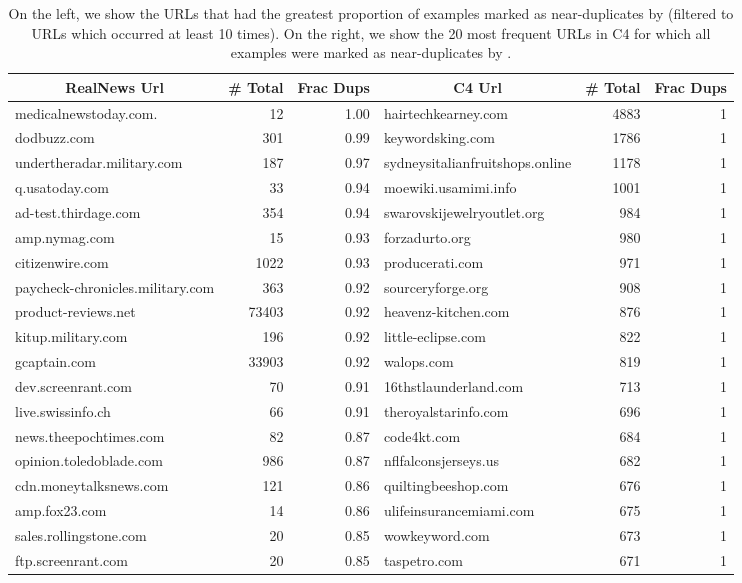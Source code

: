\begin{table*}[ttbp]
  \centering
  \small
    \begin{tabular}{lrr||lrr}
    \toprule
    \multicolumn{1}{c}{RealNews Url} & \multicolumn{1}{c}{\# Total} & \multicolumn{1}{c}{Frac Dups} & \multicolumn{1}{c}{C4 Url} & \multicolumn{1}{c}{\# Total} & \multicolumn{1}{c}{Frac Dups} \\
    \hline
    medicalnewstoday.com. & 12    & 1.00  & hairtechkearney.com & 4883  & 1 \\
    dodbuzz.com & 301   & 0.99  & keywordsking.com & 1786  & 1 \\
    undertheradar.military.com & 187   & 0.97  & sydneysitalianfruitshops.online & 1178  & 1 \\
    q.usatoday.com & 33    & 0.94  & moewiki.usamimi.info & 1001  & 1 \\
    ad-test.thirdage.com & 354   & 0.94  & swarovskijewelryoutlet.org & 984   & 1 \\
    amp.nymag.com & 15    & 0.93  & forzadurto.org & 980   & 1 \\
    citizenwire.com & 1022  & 0.93  & producerati.com & 971   & 1 \\
    paycheck-chronicles.military.com & 363   & 0.92  & sourceryforge.org & 908   & 1 \\
    product-reviews.net & 73403 & 0.92  & heavenz-kitchen.com & 876   & 1 \\
    kitup.military.com & 196   & 0.92  & little-eclipse.com & 822   & 1 \\
    gcaptain.com & 33903 & 0.92  & walops.com & 819   & 1 \\
    dev.screenrant.com & 70    & 0.91  & 16thstlaunderland.com & 713   & 1 \\
    live.swissinfo.ch & 66    & 0.91  & theroyalstarinfo.com & 696   & 1 \\
    news.theepochtimes.com & 82    & 0.87  & code4kt.com & 684   & 1 \\
    opinion.toledoblade.com & 986   & 0.87  & nflfalconsjerseys.us & 682   & 1 \\
    cdn.moneytalksnews.com & 121   & 0.86  & quiltingbeeshop.com & 676   & 1 \\
    amp.fox23.com & 14    & 0.86  & ulifeinsurancemiami.com & 675   & 1 \\
    sales.rollingstone.com & 20    & 0.85  & wowkeyword.com & 673   & 1 \\
    ftp.screenrant.com & 20    & 0.85  & taspetro.com & 671   & 1 \\
    \bottomrule
    \end{tabular}%
  \caption{On the left, we show the URLs that had the greatest proportion of examples marked as near-duplicates by \Approx (filtered to URLs which occurred at least 10 times). On the right, we show the 20 most frequent URLs in C4 for which all examples were marked as near-duplicates by \Approx.}
  \label{tab:urls}%
\end{table*}%